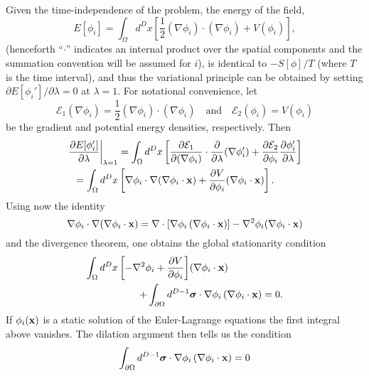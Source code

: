 \documentclass[a4paper,prd,twocolumn,showpacs,amsmath]{revtex4}
\newcommand{\vecx}{{\bf x}}
\newcommand{\vecsigma}{{\bm \sigma}}
\newcommand{\domega}{\partial \Omega}
\newcommand{\E}{{\mathcal E}}
\begin{document}
Given the time-independence of the problem, the energy of the field,
\begin{equation}
  E[\phi_i] = \int_\Omega d^D x \left[ \frac{1}{2} (\nabla\phi_i)\cdot(\nabla\phi_i) + V(\phi_i) \right],
\end{equation}
(henceforth ``$\cdot$'' indicates an internal product over the spatial components and the summation
convention will be assumed for $i$), is identical to $-S[\phi]/T$ (where $T$ is the time interval), and thus the
variational principle can be obtained by setting $\partial E[\phi_i']/\partial\lambda=0$ at $\lambda=1$.
For notational convenience, let
\begin{equation}
  \E_1(\nabla \phi_i)=\frac{1}{2}(\nabla\phi_i)\cdot(\nabla\phi_i) \quad \text{and} \quad \E_2(\phi_i)= V(\phi_i)
\end{equation}
be the gradient and potential energy densities, respectively. Then
\begin{align}
  \left. \frac{\partial E[\phi_i']}{\partial \lambda} \right|_{\lambda=1} & = \int_\Omega d^D x
        \left[ \frac{\partial \E_1}{\partial (\nabla\phi_i)}\cdot\frac{\partial}{\partial\lambda}(\nabla\phi_i') +
               \frac{\partial \E_2}{\partial\phi_i}\frac{\partial\phi_i'}{\partial\lambda} \right]\nonumber \\
     = \int_\Omega d^D x & \left[\nabla\phi_i\cdot\nabla(\nabla\phi_i\cdot\vecx) + \frac{\partial V}{\partial \phi_i}(\nabla\phi_i\cdot\vecx)\right].
\end{align}
Using now the identity
\begin{equation}
  \nabla\phi_i\cdot\nabla(\nabla\phi_i\cdot\vecx) = \nabla \cdot \left[ \nabla\phi_i\,(\nabla\phi_i\cdot\vecx)\right] -
    \nabla^2\phi_i(\nabla\phi_i\cdot\vecx)
\end{equation}
and the divergence theorem, one obtains the global stationarity condition
\begin{align}
\int_\Omega d^D x \left[ - \nabla^2 \phi_i + \frac{\partial V}{\partial \phi_i} \right]&(\nabla \phi_i \cdot \vecx) \nonumber \\
     + \int_{\domega} d^{D-1} &\vecsigma \cdot \nabla \phi_i \, (\nabla \phi_i \cdot \vecx) = 0. \label{first_deriv}
\end{align}
If $\phi_i(\vecx)$ is a static solution of the Euler-Lagrange equations the first integral above
vanishes. The dilation argument then tells us the condition
\begin{equation} \label{first_cond}
  \int_{\domega} d^{D-1}\vecsigma \cdot \nabla \phi_i \, (\nabla \phi_i \cdot \vecx) = 0
\end{equation}
\end{document}
